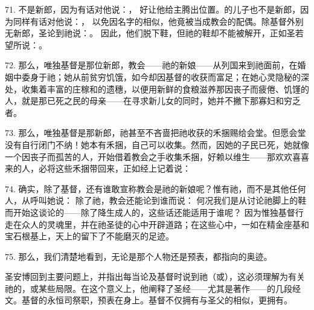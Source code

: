 71. 不是新郎，因为有话对他说：， 好让他给主腾出位置。的儿子也不是新郎，因为同样有话对他说：， 以免因名字的相似，他竟被当成教会的配偶。除基督外别无新郎，圣论到祂说：。 因此，他们脱下鞋，但祂的鞋却不能被解开，正如圣若望所说：。\par

72. 那么，唯独基督是那位新郎，教会——祂的新娘——从列国来到祂面前，在婚姻中委身于祂；她从前贫穷饥饿，如今却因基督的收获而富足；在她心灵隐秘的深处，收集着丰富的庄稼和的遗穗，以便用新鲜的食粮滋养那因丧子而疲倦、饥馑的人，就是那已死之民的母亲——在寻求新儿女的同时，她并不撇下那寡妇和穷乏者。\par

73. 那么，唯独基督是那新郎，祂甚至不吝啬把祂收获的禾捆赐给会堂。但愿会堂没有自行闭门不纳！她本有禾捆，自己可以收集。然而，因她的子民已死，她就像一个因丧子而孤苦的人，开始借着教会之手收集禾捆，好赖以维生——那欢欢喜喜来的人，必将这些禾捆带回来，正如经上记着说：\par

74. 确实，除了基督，还有谁敢宣称教会是祂的新娘呢？惟有祂，而不是其他任何人，从呼叫她说： 除了祂，教会还能论到谁而说： 何况我们是从讨论祂脚上的鞋而开始这谈论的——除了降生成人的，这些话还能适用于谁呢？ 因为惟独基督行走在众人的灵魂里，并在祂圣徒的心中开辟道路；在这些心中，一如在精金座基和宝石根基上，天上的留下了不能磨灭的足迹。\par

75. 那么，我们清楚地看到，无论是那个人物还是预表，都指向的奥迹。\par

圣安博回到主要问题上，并指出每当论及基督时说到祂（或），这必须理解为有关祂的，或某些局限。在这个意义上，他阐释了圣经——尤其是著作——的几段经文。基督的永恒司祭职，预表在身上。基督不仅拥有与圣父的相似，更拥有。\par

